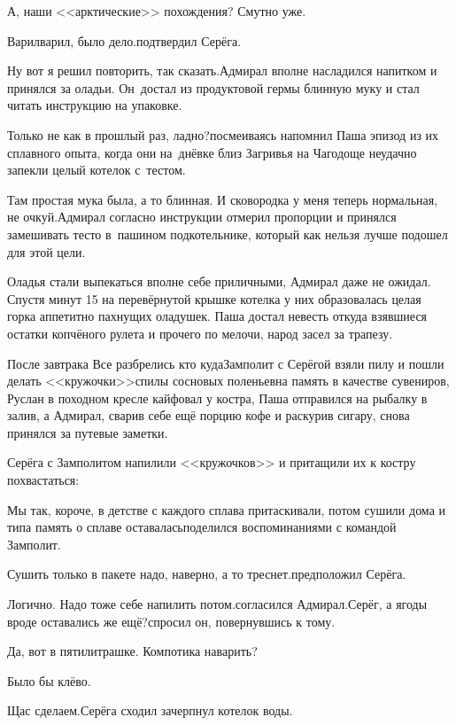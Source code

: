 \diagdash А, наши <<арктические>> похождения? Смутно уже.

\diagdash Варил\sdash варил, было дело.\mdash подтвердил Серёга.

\diagdash Ну вот я решил повторить, так сказать.\mdash Адмирал вполне насладился напитком и принялся за оладьи. Он~достал из продуктовой гермы блинную муку и стал читать инструкцию на упаковке.

\diagdash Только не как в прошлый раз, ладно?\mdash посмеиваясь напомнил Паша эпизод из их сплавного опыта, когда они на~днёвке близ Загривья на Чагодоще неудачно запекли целый котелок с~тестом.

\diagdash Там простая мука была, а то блинная. И сковородка у меня теперь нормальная, не очкуй.\mdash Адмирал согласно инструкции отмерил пропорции и принялся замешивать тесто в~пашином подкотельнике, который как нельзя лучше подошел для этой цели.

Оладья стали выпекаться вполне себе приличными, Адмирал даже не ожидал. Спустя минут 15 на перевёрнутой крышке котелка у них образовалась целая горка аппетитно пахнущих оладушек. Паша достал невесть откуда взявшиеся остатки копчёного рулета и прочего по мелочи, народ засел за трапезу.

После завтрака Все разбрелись кто куда\mdash Замполит с Серёгой взяли пилу и пошли делать <<кружочки>>\mdash спилы сосновых поленьев\mdash на память в качестве сувениров, Руслан в походном кресле кайфовал у костра, Паша отправился на рыбалку в залив, а Адмирал, сварив себе ещё порцию кофе и раскурив сигару, снова принялся за путевые заметки.

Серёга с Замполитом напилили <<кружочков>> и притащили их к костру похвастаться:

\diagdash Мы так, короче, в детстве с каждого сплава притаскивали, потом сушили дома и типа память о сплаве оставалась\mdash поделился воспоминаниями с командой Замполит.

\diagdash Сушить только в пакете надо, наверно, а то треснет.\mdash предположил Серёга.

\diagdash Логично. Надо тоже себе напилить потом.\mdash согласился Адмирал.\mdash Серёг, а ягоды вроде оставались же ещё?\mdash спросил он, повернувшись к тому.

\diagdash Да, вот в пятилитрашке. Компотика наварить?

\diagdash Было бы клёво.

\diagdash Щас сделаем.\mdash Серёга сходил зачерпнул котелок воды.

